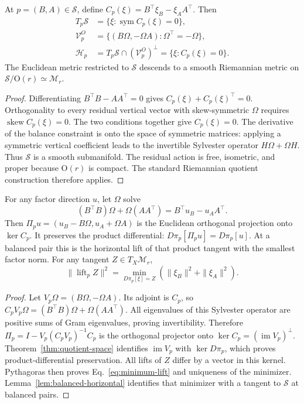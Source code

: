 \begin{lemma}
\label{lem:balanced-horizontal}
At $p=(B,A)\in\mathcal S$, define
$C_p(\xi)=B^\top\xi_B-\xi_AA^\top$. Then
\begin{align}
 T_p\mathcal S&=\{\xi:\operatorname{sym}C_p(\xi)=0\},\\
 \mathcal V^{O}_p&=\{(B\Omega,-\Omega A):\Omega^\top=-\Omega\},\\
 \mathcal H_p&=T_p\mathcal S\cap(\mathcal V^O_p)^\perp
             =\{\xi:C_p(\xi)=0\}.
 \label{eq:true-horizontal}
\end{align}
The Euclidean metric restricted to $\mathcal S$ descends to a smooth
Riemannian metric on $\mathcal S/\mathrm O(r)\simeq\mathcal M_r$.
\end{lemma}
\begin{proof}
Differentiating $B^\top B-AA^\top=0$ gives
$C_p(\xi)+C_p(\xi)^\top=0$. Orthogonality to every residual vertical
vector with skew-symmetric $\Omega$ requires
$\operatorname{skew}C_p(\xi)=0$. The two conditions together give
$C_p(\xi)=0$. The derivative of the balance constraint is onto the space
of symmetric matrices: applying a symmetric vertical coefficient leads to
the invertible Sylvester operator $H\Omega+\Omega H$. Thus $\mathcal S$
is a smooth submanifold. The residual action is free, isometric, and proper
because $\mathrm O(r)$ is compact. The standard Riemannian quotient
construction therefore applies.
\end{proof}

\begin{proposition}
\label{prop:minimum-lift}
For any factor direction $u$, let $\Omega$ solve
\begin{equation}
 (B^\top B)\Omega+\Omega(AA^\top)=B^\top u_B-u_AA^\top.
 \label{eq:exact-sylvester}
\end{equation}
Then $\Pi_pu=(u_B-B\Omega,u_A+\Omega A)$ is the Euclidean orthogonal
projection onto $\ker C_p$. It preserves the product differential:
$D\pi_p[\Pi_pu]=D\pi_p[u]$. At a balanced pair this is the horizontal
lift of that product tangent with the smallest factor norm. For any tangent
$Z\in T_X\mathcal M_r$,
\begin{equation}
 \|\operatorname{lift}_p Z\|^2
 =\min_{D\pi_p[\xi]=Z}(\|\xi_B\|^2+\|\xi_A\|^2).
 \label{eq:minimum-lift}
\end{equation}
\end{proposition}
\begin{proof}
Let $V_p\Omega=(B\Omega,-\Omega A)$. Its adjoint is $C_p$, so
$C_pV_p\Omega=(B^\top B)\Omega+\Omega(AA^\top)$.
All eigenvalues of this Sylvester operator are positive sums of Gram
eigenvalues, proving invertibility. Therefore
$\Pi_p=I-V_p(C_pV_p)^{-1}C_p$ is the orthogonal projector onto
$\ker C_p=(\operatorname{im}V_p)^\perp$. Theorem~\ref{thm:quotient-space}
identifies $\operatorname{im}V_p$ with $\ker D\pi_p$, which proves
product-differential preservation. All lifts of $Z$ differ by a vector in
this kernel. Pythagoras then proves Eq.~\eqref{eq:minimum-lift} and
uniqueness of the minimizer. Lemma~\ref{lem:balanced-horizontal} identifies
that minimizer with a tangent to $\mathcal S$ at balanced pairs.
\end{proof}

